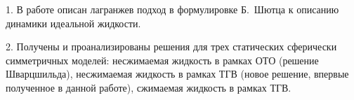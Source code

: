 \documentclass[\docroot/reports/draft/report.tex]{subfiles}
\begin{document}
\onlyinsubfile{\tableofcontents}

1. В работе описан лагранжев подход в формулировке Б.~Шютца к описанию динамики идеальной жидкости.

2. Получены и проанализированы решения для трех статических сферически симметричных моделей: несжимаемая жидкость в рамках ОТО (решение Шварцшильда), несжимаемая жидкость в рамках ТГВ (новое решение, впервые полученное в данной работе), сжимаемая жидкость в рамках ТГВ.

\end{document}
